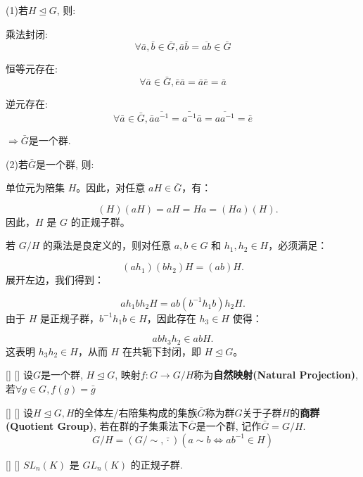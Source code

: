 \documentclass[UTF8]{ctexart}
\begin{document}
		\begin{prf}
			
			(1)若$H\trianglelefteq G$, 则: 
			
			乘法封闭: 
			\[\forall \bar{a},\bar{b}\in \bar{G}, \bar{a}\bar{b}=\overline{ab}\in\bar{G}\]
			
			恒等元存在: $$\forall \bar{a}\in \bar{G}, \bar{e}\bar{a}=\bar{a}\bar{e}=\bar{a}$$
			
			逆元存在: $$\forall \bar{a}\in \bar{G}, \bar{a}\overline{a^{-1}}=\bar{a^{-1}}\bar{a}=\overline{aa^{-1}}=\bar{e}$$
			
			$\Longrightarrow\bar{G}$是一个群. 
			
			(2)若$\bar{G}$是一个群, 则: 
			
			单位元为陪集 $H$。因此，对任意 $aH \in \bar{G}$，有：

			$$
			\quad (H)(aH) = aH = Ha = (Ha)(H).
			$$ 
			因此，$H$ 是 $G$ 的正规子群。

			若 $G/H$ 的乘法是良定义的，则对任意 $a, b \in G$ 和 $h_1, h_2 \in H$，必须满足：

			$$
			(ah_1)(bh_2)H = (ab)H.
			$$ 
			展开左边，我们得到：

			$$
			ah_1bh_2H = ab(b^{-1}h_1b)h_2H.
			$$ 
			由于 $H$ 是正规子群，$b^{-1}h_1b \in H$，因此存在 $h_3 \in H$ 使得：

			$$
			abh_3h_2 \in abH.
			$$ 
			这表明 $h_3h_2 \in H$，从而 $H$ 在共轭下封闭，即 $H \trianglelefteq G$。

			
		\end{prf}
  
		\begin{dfn}
            []
            {}
            []
            []
			设$G$是一个群, $H\trianglelefteq G$, 映射$f:G\to G/H$称为\textbf{自然映射(Natural Projection)}, 若$\forall g\in G, f(g)=\bar{g}$
		\end{dfn}
		
		\begin{dfn}
            []
            {}
            []
            []
			设$H\trianglelefteq G, H$的全体左/右陪集构成的集族$\bar{G}$称为群$G$关于子群$H$的\textbf{商群(Quotient Group)}, 若在群的子集乘法下$\bar{G}$是一个群, 记作$\bar{G}=G/H$. 
			\[G/H=(G/\sim,\bar{\cdot})(a\sim b\iff ab^{-1}\in H)\]
		\end{dfn}

		\begin{xmp}
            []
            {}
            []
            []
			$SL_n(K)$ 是 $GL_n(K)$ 的正规子群.
		\end{xmp}
\end{document}
